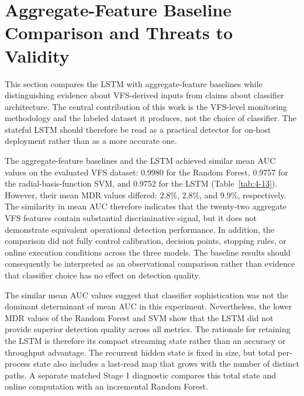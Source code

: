 \section{Aggregate-Feature Baseline Comparison and Threats to Validity}\label{sec:4.9}

This section compares the \textmu{}LSTM with aggregate-feature baselines while distinguishing evidence about VFS-derived inputs from claims about classifier architecture. The central contribution of this work is the VFS-level monitoring methodology and the labeled dataset it produces, not the choice of classifier. The stateful \textmu{}LSTM should therefore be read as a practical detector for on-host deployment rather than as a more accurate one.

The aggregate-feature baselines and the \textmu{}LSTM achieved similar mean AUC values on the evaluated VFS dataset: 0.9980 for the Random Forest, 0.9757 for the radial-basis-function SVM, and 0.9752 for the \textmu{}LSTM (Table~\ref{tab:4-13}). However, their mean MDR values differed: 2.8\%, 2.8\%, and 9.9\%, respectively. The similarity in mean AUC therefore indicates that the twenty-two aggregate VFS features contain substantial discriminative signal, but it does not demonstrate equivalent operational detection performance. In addition, the comparison did not fully control calibration, decision points, stopping rules, or online execution conditions across the three models. The baseline results should consequently be interpreted as an observational comparison rather than evidence that classifier choice has no effect on detection quality.

The similar mean AUC values suggest that classifier sophistication was not the dominant determinant of mean AUC in this experiment. Nevertheless, the lower MDR values of the Random Forest and SVM show that the \textmu{}LSTM did not provide superior detection quality across all metrics. The rationale for retaining the \textmu{}LSTM is therefore its compact streaming state rather than an accuracy or throughput advantage. The recurrent hidden state is fixed in size, but total per-process state also includes a last-read map that grows with the number of distinct paths. A separate matched Stage 1 diagnostic compares this total state and online computation with an incremental Random Forest.

